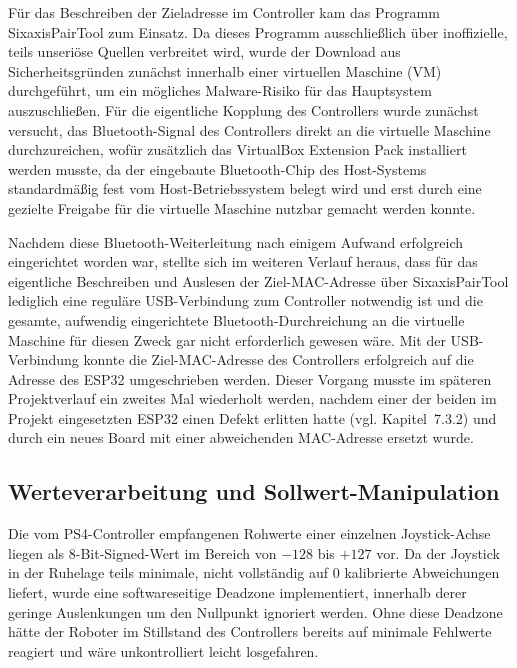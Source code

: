 \documentclass[12pt,ngerman,numbers=noenddot,abstracton,headsepline]{scrreprt}
\begin{document}
Für das Beschreiben der Zieladresse im Controller kam das Programm SixaxisPairTool zum Einsatz. Da dieses Programm ausschließlich über inoffizielle, teils unseriöse Quellen verbreitet wird, wurde der Download aus Sicherheitsgründen zunächst innerhalb einer virtuellen Maschine (VM) durchgeführt, um ein mögliches Malware-Risiko für das Hauptsystem auszuschließen. Für die eigentliche Kopplung des Controllers wurde zunächst versucht, das Bluetooth-Signal des Controllers direkt an die virtuelle Maschine durchzureichen, wofür zusätzlich das VirtualBox Extension Pack installiert werden musste, da der eingebaute Bluetooth-Chip des Host-Systems standardmäßig fest vom Host-Betriebssystem belegt wird und erst durch eine gezielte Freigabe für die virtuelle Maschine nutzbar gemacht werden konnte.

Nachdem diese Bluetooth-Weiterleitung nach einigem Aufwand erfolgreich eingerichtet worden war, stellte sich im weiteren Verlauf heraus, dass für das eigentliche Beschreiben und Auslesen der Ziel-MAC-Adresse über SixaxisPairTool lediglich eine reguläre USB-Verbindung zum Controller notwendig ist und die gesamte, aufwendig eingerichtete Bluetooth-Durchreichung an die virtuelle Maschine für diesen Zweck gar nicht erforderlich gewesen wäre. Mit der USB-Verbindung konnte die Ziel-MAC-Adresse des Controllers erfolgreich auf die Adresse des ESP32 umgeschrieben werden. Dieser Vorgang musste im späteren Projektverlauf ein zweites Mal wiederholt werden, nachdem einer der beiden im Projekt eingesetzten ESP32 einen Defekt erlitten hatte (vgl. Kapitel~7.3.2) und durch ein neues Board mit einer abweichenden MAC-Adresse ersetzt wurde.

\subsection{Werteverarbeitung und Sollwert-Manipulation}
\label{subsec:ps4_werteverarbeitung}

Die vom PS4-Controller empfangenen Rohwerte einer einzelnen Joystick-Achse liegen als 8-Bit-Signed-Wert im Bereich von $-128$ bis $+127$ vor. Da der Joystick in der Ruhelage teils minimale, nicht vollständig auf 0 kalibrierte Abweichungen liefert, wurde eine softwareseitige Deadzone implementiert, innerhalb derer geringe Auslenkungen um den Nullpunkt ignoriert werden. Ohne diese Deadzone hätte der Roboter im Stillstand des Controllers bereits auf minimale Fehlwerte reagiert und wäre unkontrolliert leicht losgefahren.
\end{document}
